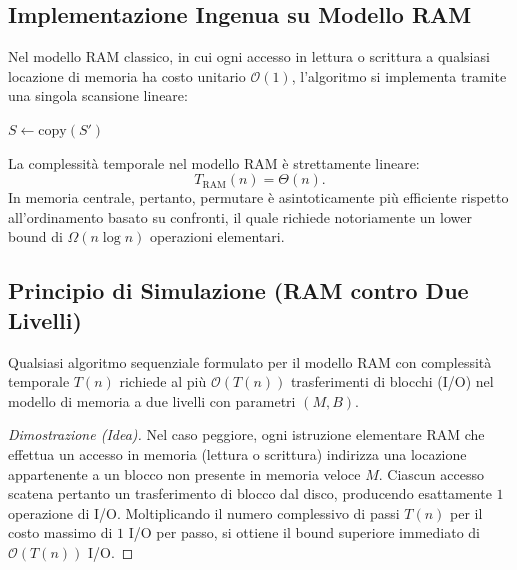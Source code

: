 \subsection{Implementazione Ingenua su Modello RAM}
\label{subsec:naive-ram}

Nel modello RAM classico, in cui ogni accesso in lettura o scrittura a qualsiasi locazione di memoria ha costo unitario $\mathcal{O}(1)$, l'algoritmo si implementa tramite una singola scansione lineare:

\begin{algorithm}[H]
  \DontPrintSemicolon
  $S \leftarrow \mathrm{copy}(S')$\;
  \caption{Permutazione Diretta su RAM}
\end{algorithm}

La complessità temporale nel modello RAM è strettamente lineare:
\[
  T_{\mathrm{RAM}}(n) = \Theta(n).
\]
In memoria centrale, pertanto, permutare è asintoticamente più efficiente rispetto all'ordinamento basato su confronti, il quale richiede notoriamente un lower bound di $\Omega(n \log n)$ operazioni elementari.

\subsection{Principio di Simulazione (RAM contro Due Livelli)}
\label{subsec:simulation-principle}

\begin{theorem}
\label{thm:simulation}
Qualsiasi algoritmo sequenziale formulato per il modello RAM con complessità temporale $T(n)$ richiede al più $\mathcal{O}(T(n))$ trasferimenti di blocchi (I/O) nel modello di memoria a due livelli con parametri $(M, B)$.
\end{theorem}

\begin{proof}[Dimostrazione (Idea)]
Nel caso peggiore, ogni istruzione elementare RAM che effettua un accesso in memoria (lettura o scrittura) indirizza una locazione appartenente a un blocco non presente in memoria veloce $M$. Ciascun accesso scatena pertanto un trasferimento di blocco dal disco, producendo esattamente $1$ operazione di I/O. Moltiplicando il numero complessivo di passi $T(n)$ per il costo massimo di $1$ I/O per passo, si ottiene il bound superiore immediato di $\mathcal{O}(T(n))$ I/O.
\end{proof}

